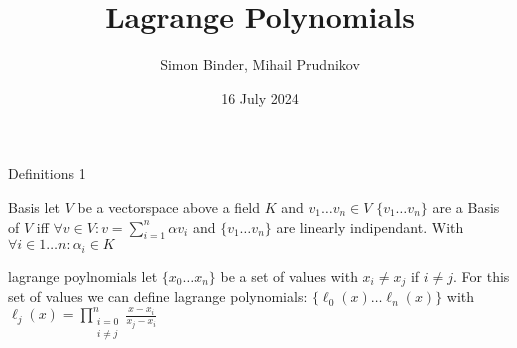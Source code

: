 \documentclass[8pt]{beamer}
\title{Lagrange Polynomials}
\date{16 July 2024}
\author{Simon Binder, Mihail Prudnikov}
\begin{document}
\begin{frame}[plain]
    \maketitle
\end{frame}
\begin{frame}{Definitions 1}
	\begin{block}{Basis}
		let $V$ be a vectorspace above a field $K$ and $v_1 \ldots v_n \in V$ $\{ v_1 \ldots v_n\} $ are a Basis of $V$ iff $\forall v \in V: v = \sum_{i =1}^{n}\alpha v_i$ and $\{ v_1 \ldots v_n\}$ are linearly indipendant. With $\forall i \in 1\ldots n: \alpha_i \in K $
	\end{block}
	\begin{block}{lagrange poylnomials}
		let $\{x_0\ldots x_n \}$ be a set of values with $x_i \neq x_j$ if $i \neq j$. For this set of values we can define lagrange polynomials: $\{\ell_0(x)\ldots \ell_n(x)\}$ with $\ell_j(x) = 
		\displaystyle \prod_{\substack{i= 0 \\ i \neq j }}^{n}\frac{x - x_i}{x_j - x_i}$ 
	\end{block}
\end{frame}
\end{document}
